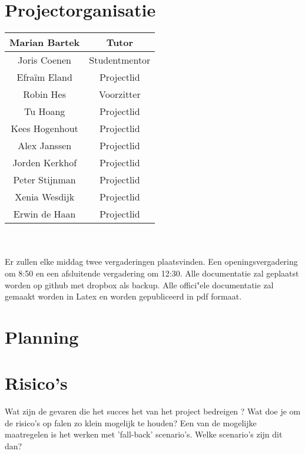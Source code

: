 \documentclass{scrartcl}
\begin{document}
\section{Projectorganisatie}
\begin {tabular}{|c|c|}
\hline
Marian Bartek & Tutor\\
\hline
Joris Coenen & Studentmentor\\
\hline
Efraïm Eland & Projectlid\\
\hline
Robin Hes & Voorzitter\\
\hline
Tu Hoang & Projectlid\\
\hline
Kees Hogenhout & Projectlid\\
\hline
Alex Janssen & Projectlid\\
\hline
Jorden Kerkhof & Projectlid\\
\hline
Peter Stijnman & Projectlid\\
\hline
Xenia Wesdijk & Projectlid\\
\hline
Erwin de Haan & Projectlid\\
\hline
\end {tabular}
\\
\\Er zullen elke middag twee vergaderingen plaatsvinden. Een openingsvergadering om 8:50 en een afsluitende vergadering om 12:30.
Alle documentatie zal geplaatst worden op github met dropbox als backup.
Alle offici"ele documentatie zal gemaakt worden in Latex en worden gepubliceerd in pdf formaat.

\section{Planning}





\section{Risico's}
Wat zijn de gevaren die het succes het van het project bedreigen ? Wat doe je om de risico's op falen zo klein mogelijk te houden? Een van de mogelijke maatregelen is het werken met 'fall-back' scenario’s. Welke scenario's zijn dit dan?

\makebibliography
\end{document}
